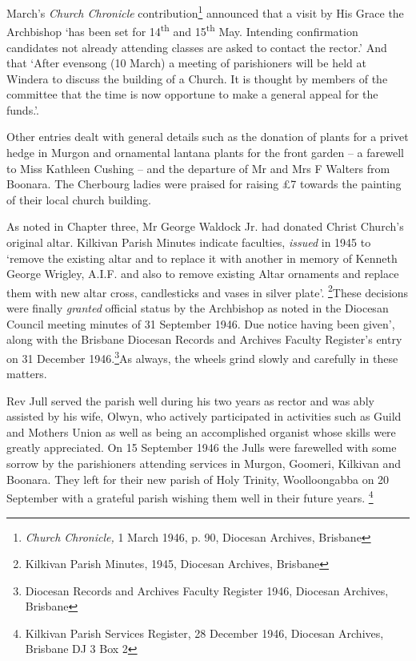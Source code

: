 March's \emph{Church Chronicle} contribution\footnote{\emph{Church Chronicle,} 1 March 1946, p. 90, Diocesan Archives, Brisbane} announced that a visit by His Grace the Archbishop `has been set for 14\textsuperscript{th} and 15\textsuperscript{th} May. Intending confirmation candidates not already attending classes are asked to contact the rector.' And that `After evensong (10 March) a meeting of parishioners will be held at Windera to discuss the building of a Church. It is thought by members of the committee that the time is now opportune to make a general appeal for the funds.'.


Other entries dealt with general details such as the donation of plants for a privet hedge in Murgon and ornamental lantana plants for the front garden -- a farewell to Miss Kathleen Cushing -- and the departure of Mr and Mrs F Walters from Boonara. The Cherbourg ladies were praised for raising \pounds7 towards the painting of their local church building.



As noted in Chapter three, Mr George Waldock Jr. had donated Christ Church's original altar. Kilkivan Parish Minutes indicate faculties, \emph{issued} in 1945 to `remove the existing altar and to replace it with another in memory of Kenneth George Wrigley, A.I.F. and also to remove existing Altar ornaments and replace them with new altar cross, candlesticks and vases in silver plate'. \footnote{Kilkivan Parish Minutes, 1945, Diocesan Archives, Brisbane}These decisions were finally \emph{granted} official status by the Archbishop as noted in the Diocesan Council meeting minutes of 31 September 1946. Due notice having been given', along with the Brisbane Diocesan Records and Archives Faculty Register's entry on 31 December 1946.\footnote{Diocesan Records and Archives Faculty Register 1946, Diocesan Archives, Brisbane}As always, the wheels grind slowly and carefully in these matters.


Rev Jull served the parish well during his two years as rector and was ably assisted by his wife, Olwyn, who actively participated in activities such as Guild and Mothers Union as well as being an accomplished organist whose skills were greatly appreciated. On 15 September 1946 the Julls were farewelled with some sorrow by the parishioners attending services in Murgon, Goomeri, Kilkivan and Boonara. They left for their new parish of Holy Trinity, Woolloongabba on 20 September with a grateful parish wishing them well in their future years. \footnote{Kilkivan Parish Services Register, 28 December 1946, Diocesan Archives, Brisbane DJ 3 Box 2}


